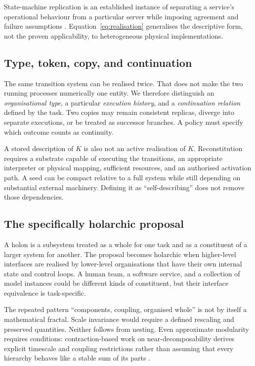 \documentclass[11pt,a4paper]{article}
\theoremstyle{definition}
\theoremstyle{remark}
\newcommand{\calK}{K}
\begin{document}
State-machine replication is an established instance of separating a service's operational behaviour from a particular server while imposing agreement and failure assumptions \citep{schneider}. Equation~\eqref{eq:realisation} generalises the descriptive form, not the proven applicability, to heterogeneous physical implementations.

\subsection{Type, token, copy, and continuation}
The same transition system can be realised twice. That does not make the two running processes numerically one entity. We therefore distinguish an \emph{organisational type}, a particular \emph{execution history}, and a \emph{continuation relation} defined by the task. Two copies may remain consistent replicas, diverge into separate executions, or be treated as successor branches. A policy must specify which outcome counts as continuity.

A stored description of $\calK$ is also not an active realisation of $\calK$. Reconstitution requires a substrate capable of executing the transitions, an appropriate interpreter or physical mapping, sufficient resources, and an authorised activation path. A seed can be compact relative to a full system while still depending on substantial external machinery. Defining it as ``self-describing'' does not remove those dependencies.

\subsection{The specifically holarchic proposal}
A holon is a subsystem treated as a whole for one task and as a constituent of a larger system for another. The proposal becomes holarchic when higher-level interfaces are realised by lower-level organisations that have their own internal state and control loops. A human team, a software service, and a collection of model instances could be different kinds of constituent, but their interface equivalence is task-specific.

The repeated pattern ``components, coupling, organised whole'' is not by itself a mathematical fractal. Scale invariance would require a defined rescaling and preserved quantities. Neither follows from nesting. Even approximate modularity requires conditions: contraction-based work on near-decomposability derives explicit timescale and coupling restrictions rather than assuming that every hierarchy behaves like a stable sum of its parts \citep{bousquet}.
\end{document}
